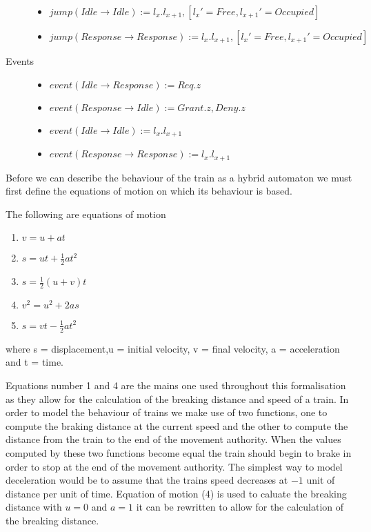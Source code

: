 \begin{mydef}
\begin{description}
\begin{itemize}
	\item $jump(Idle \to Idle) := l_x. l_{x+1} , [l_x' = Free, l_{x+1}' = Occupied]$

	\item $jump(Response \to Response) := l_x. l_{x+1} , [l_x' = Free, l_{x+1}' = Occupied]$


	\end{itemize}

\item[Events] \hspace*{0mm}
\begin{itemize}
	\item $event (Idle \to Response) := Req.z$
	\item $event(Response \to Idle) :={Grant.z,Deny.z}$
	\item $event(Idle \to Idle) := l_x.l_{x+1}$
	\item $event(Response \to Response) := l_x.l_{x+1}$	
\end{itemize}

\end{description}
\end{mydef} 
\medskip
Before we can describe the behaviour of the train as a hybrid automaton we must first define the equations of motion on which its behaviour is based.
\medskip
\begin{mydef}
The following are equations of motion
\begin{enumerate}
\item $v = u +at$
\item $s = ut + \frac{1}{2}at^2$
\item $s = \frac{1}{2}(u + v)t$
\item $v^2 = u^2 +2as$
\item $s = vt - \frac{1}{2}at^2$
\end{enumerate}
where s = displacement,u = initial velocity, v = final velocity, a = acceleration and t = time.
\end{mydef}
\medskip
Equations number 1 and 4 are the mains one used throughout this formalisation as they allow for the calculation of the breaking distance and speed of a train.
In order to model the behaviour of trains we make use of two functions, one to compute the braking distance at the current speed and the other to compute the distance from the train to the end of the movement authority. When the values computed by these two functions become equal the train should begin to brake in order to stop at the end of the movement authority. The simplest way to model deceleration would be to assume that the trains speed decreases at $-1$ unit of distance per unit of time. Equation of motion (4) is used to caluate the breaking distance with $u = 0$ and $a = 1$ it can be rewritten to allow for the calculation of the breaking distance.

